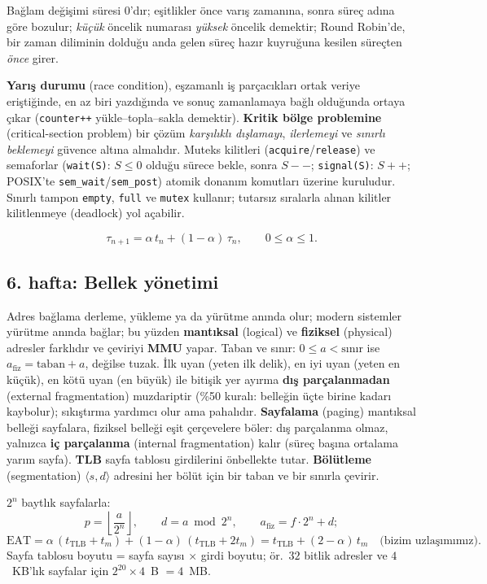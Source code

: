 \documentclass[11pt,a4paper]{article}
\newcommand{\term}[1]{\textbf{\color{mintdeep}#1}}
\newcommand{\cmd}[1]{\texttt{#1}}
\begin{document}
\begin{keyidea}
Bağlam değişimi süresi $0$'dır; eşitlikler önce varış zamanına, sonra süreç adına göre bozulur; \emph{küçük} öncelik numarası \emph{yüksek} öncelik demektir; Round Robin'de, bir zaman diliminin dolduğu anda gelen süreç hazır kuyruğuna kesilen süreçten \emph{önce} girer.
\end{keyidea}

\term{Yarış durumu} (race condition), eşzamanlı iş parçacıkları ortak veriye eriştiğinde, en az biri yazdığında ve sonuç zamanlamaya bağlı olduğunda ortaya çıkar (\texttt{counter++} yükle--topla--sakla demektir). \term{Kritik bölge problemine} (critical-section problem) bir çözüm \emph{karşılıklı dışlamayı}, \emph{ilerlemeyi} ve \emph{sınırlı beklemeyi} güvence altına almalıdır. Muteks kilitleri (\texttt{acquire}/\texttt{release}) ve semaforlar (\texttt{wait(S)}: $S \le 0$ olduğu sürece bekle, sonra $S{-}{-}$; \texttt{signal(S)}: $S{+}{+}$; POSIX'te \cmd{sem\_wait}/\cmd{sem\_post}) atomik donanım komutları üzerine kuruludur. Sınırlı tampon \texttt{empty}, \texttt{full} ve \texttt{mutex} kullanır; tutarsız sıralarla alınan kilitler kilitlenmeye (deadlock) yol açabilir.
\begin{example}
\[
\tau_{n+1} = \alpha\, t_n + (1-\alpha)\,\tau_n, \qquad 0 \le \alpha \le 1.
\]
\end{example}

\subsection{6. hafta: Bellek yönetimi}
Adres bağlama derleme, yükleme ya da yürütme anında olur; modern sistemler yürütme anında bağlar; bu yüzden \term{mantıksal} (logical) ve \term{fiziksel} (physical) adresler farklıdır ve çeviriyi \term{MMU} yapar. Taban ve sınır: $0 \le a < \text{sınır}$ ise $a_{\text{fiz}} = \text{taban} + a$, değilse tuzak. İlk uyan (yeten ilk delik), en iyi uyan (yeten en küçük), en kötü uyan (en büyük) ile bitişik yer ayırma \term{dış parçalanmadan} (external fragmentation) muzdariptir (\%50 kuralı: belleğin üçte birine kadarı kaybolur); sıkıştırma yardımcı olur ama pahalıdır. \term{Sayfalama} (paging) mantıksal belleği sayfalara, fiziksel belleği eşit çerçevelere böler: dış parçalanma olmaz, yalnızca \term{iç parçalanma} (internal fragmentation) kalır (süreç başına ortalama yarım sayfa). \term{TLB} sayfa tablosu girdilerini önbellekte tutar. \term{Bölütleme} (segmentation) $\langle s, d\rangle$ adresini her bölüt için bir taban ve bir sınırla çevirir.
\begin{example}
$2^{n}$ baytlık sayfalarla:
\[
p = \left\lfloor \frac{a}{2^{n}} \right\rfloor,\qquad d = a \bmod 2^{n},\qquad a_{\text{fiz}} = f \cdot 2^{n} + d;
\]
\[
\text{EAT} = \alpha\,(t_{\text{TLB}} + t_m) + (1-\alpha)\,(t_{\text{TLB}} + 2t_m) = t_{\text{TLB}} + (2-\alpha)\,t_m \quad\text{(bizim uzlaşımımız)}.
\]
Sayfa tablosu boyutu = sayfa sayısı $\times$ girdi boyutu; ör.\ $32$ bitlik adresler ve $4$~KB'lık sayfalar için $2^{20} \times 4$~B $= 4$~MB.
\end{example}
\end{document}
